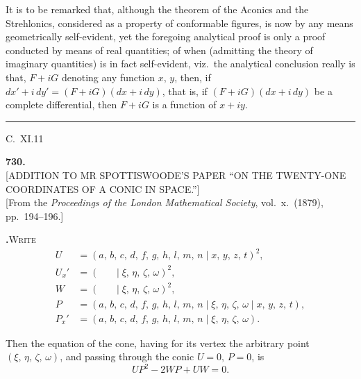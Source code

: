 \documentclass[11pt]{article}
\newcommand{\artno}[1]{\textbf{#1.}\quad}
\begin{document}
\medskip

\noindent
It is to be remarked that, although the theorem of the Aconics and the Strehlonics,
considered as a property of conformable figures, is now by any means geometrically
self-evident, yet the foregoing analytical proof is only a proof conducted by means of
real quantities; of when (admitting the theory of imaginary quantities) is in fact
self-evident, viz.\ the analytical conclusion really is that, $F + iG$ denoting any function
$x,\,y$, then, if $dx' + i\,dy' = (F + iG)(dx + i\,dy)$, that is, if $(F + iG)(dx + i\,dy)$ be a complete
differential, then $F + iG$ is a function of $x + iy$.

\vfill

\begin{center}\rule{0.3\textwidth}{0.4pt}\end{center}

C.\ XI.\hfill 11

\newpage

\begin{center}
\textbf{730.}\\[4pt]
\textsc{[ADDITION TO MR SPOTTISWOODE'S PAPER ``ON THE TWENTY-ONE COORDINATES OF A CONIC IN SPACE.'']}\\[6pt]
\small[From the \textit{Proceedings of the London Mathematical Society}, vol.~x.\ (1879), pp.~194--196.]
\end{center}

\bigskip

\noindent
\artno{}\textsc{Write}
\begin{align*}
U &= (a,\,b,\,c,\,d,\,f,\,g,\,h,\,l,\,m,\,n \mid x,\,y,\,z,\,t)^2,\\
U_x' &= (\quad\;\; \mid \xi,\,\eta,\,\zeta,\,\omega)^2,\\
W &= (\quad\;\; \mid \xi,\,\eta,\,\zeta,\,\omega)^2,\\
P &= (a,\,b,\,c,\,d,\,f,\,g,\,h,\,l,\,m,\,n \mid \xi,\,\eta,\,\zeta,\,\omega \mid x,\,y,\,z,\,t),\\
P_x' &= (a,\,b,\,c,\,d,\,f,\,g,\,h,\,l,\,m,\,n \mid \xi,\,\eta,\,\zeta,\,\omega).
\end{align*}

\noindent
Then the equation of the cone, having for its vertex the arbitrary point $(\xi,\,\eta,\,\zeta,\,\omega)$, and
passing through the conic $U = 0,\,P = 0$, is
\[
UP^2 - 2WP + UW = 0.
\]
\end{document}
